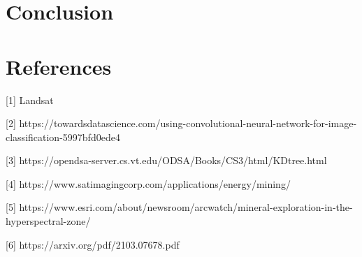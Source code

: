 \documentclass[10pt]{article}
\begin{document}
\section{Conclusion}






\section*{References}

\small

[1]  Landsat

[2] https://towardsdatascience.com/using-convolutional-neural-network-for-image-classification-5997bfd0ede4

[3] https://opendsa-server.cs.vt.edu/ODSA/Books/CS3/html/KDtree.html

[4] https://www.satimagingcorp.com/applications/energy/mining/

[5] https://www.esri.com/about/newsroom/arcwatch/mineral-exploration-in-the-hyperspectral-zone/

[6] https://arxiv.org/pdf/2103.07678.pdf




\end{document}
